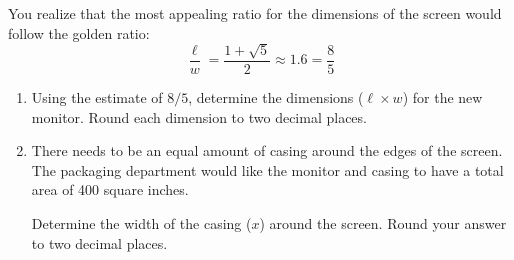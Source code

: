 \documentclass[letterpaper,12pt,fleqn]{article}
\begin{document}
\begin{enumerate}
  You realize that the most appealing ratio for the dimensions of the screen would follow the golden ratio:
  \[\frac{\ell}{w}=\frac{1+\sqrt{5}}{2}\approx1.6=\frac{8}{5}\]

  \begin{enumerate}
  \item Using the estimate of $8/5$, determine the dimensions ($\ell\times w$) for the new monitor. Round each
    dimension to two decimal places.
  \item There needs to be an equal amount of casing around the edges of the screen.  The packaging department
    would like the monitor and casing to have a total area of 400 square inches.


    Determine the width of the casing ($x$) around the screen. Round your answer to
    two decimal places.
  \end{enumerate}
\end{enumerate}
\end{document}
